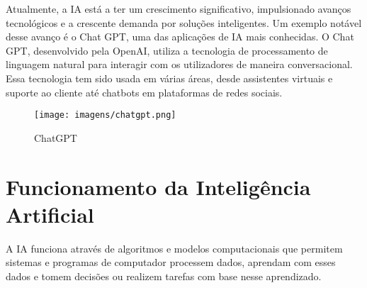 \documentclass{report}
\begin{document}
Atualmente, a \ac{IA} está a ter um crescimento significativo, impulsionado avanços
tecnológicos e a crescente demanda por soluções inteligentes. Um exemplo notável desse avanço é o Chat GPT, uma das aplicações de \ac{IA} mais conhecidas. O Chat GPT, desenvolvido pela OpenAI, utiliza a tecnologia de processamento de linguagem natural para interagir com os utilizadores de maneira conversacional. Essa tecnologia tem sido usada em várias áreas, desde assistentes virtuais e suporte ao cliente até chatbots em plataformas de redes sociais.

\begin{figure}[ht]
    \centering
    \texttt{[image: imagens/chatgpt.png]}
    \caption{ChatGPT}
    \label{fig:chatgpt}
\end{figure}


\chapter{Funcionamento da Inteligência Artificial}
\label{chap.funcionamento}
A \ac{IA} funciona através de algoritmos e modelos computacionais que permitem sistemas e programas de computador processem dados, aprendam com esses dados e tomem decisões ou realizem tarefas com base nesse aprendizado.
\end{document}
